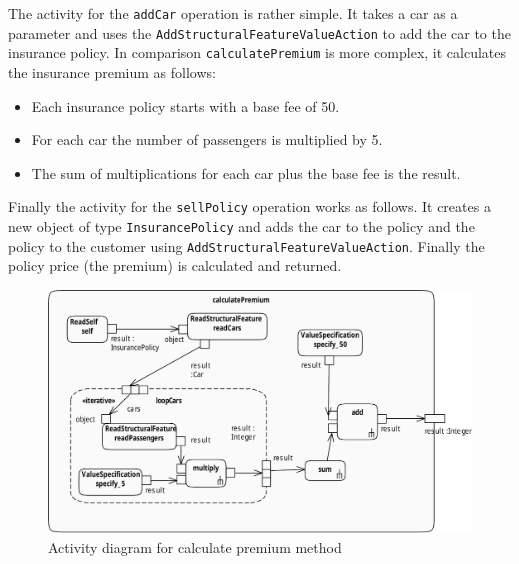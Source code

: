 \documentclass{llncs}
\begin{document}
The activity for the \lstinline|addCar| operation is rather simple. It takes a car as a parameter and uses the
\lstinline|AddStructuralFeatureValueAction| to add the car to the insurance policy. In comparison \lstinline|calculatePremium| is
more complex, it calculates the insurance premium as follows:

\begin{itemize}
 \item Each insurance policy starts with a base fee of 50.
 \item For each car the number of passengers is multiplied by 5.
 \item The sum of multiplications for each car plus the base fee is the result.
\end{itemize}

Finally the activity for the \lstinline|sellPolicy| operation works as follows. It creates a new object of type \lstinline|InsurancePolicy| and adds the car to the policy and the policy to the customer using \lstinline|AddStructuralFeatureValueAction|. Finally
the policy price (the premium) is calculated and returned.

\begin{figure}[h!t]
 \centering
 \includegraphics[scale=0.76]{images/calculatePremium.pdf}
 \caption{Activity diagram for calculate premium method}
 \label{fig:calculatePremium}
\end{figure}
\end{document}
